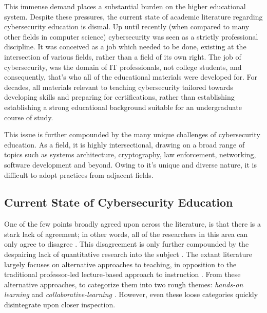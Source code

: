 \documentclass{article}
\begin{document}
    This immense demand places a substantial burden on the higher educational system. %
Despite these pressures, the current state of academic literature regarding cybersecurity education is dismal. Up until recently (when compared to many other fields in computer science) cybersecurity was seen as a strictly professional discipline. %
It was conceived as a job which needed to be done, existing at the intersection of various fields, rather than a field of its own right. %
The job of cybersecurity, was the domain of IT professionals, not college students, and consequently, that's who all of the educational materials were developed for. %
For decades, all materials relevant to teaching cybersecurity tailored towards developing skills and preparing for certifications, rather than establishing establishing a strong educational background suitable for an undergraduate course of study. 
    
    This issue is further compounded by the many unique challenges of cybersecurity education. %
As a  field, it is highly intersectional, drawing on a broad range of topics such as systems architecture, cryptography, law enforcement, networking, software development and beyond. %
Owing to it's unique and diverse nature, it is difficult to adopt practices from adjacent fields. 

    \subsection{Current State of Cybersecurity Education} 
    One of the few points broadly agreed upon across the literature, is that there is a stark lack of agreement; %
in other words, all of the researchers in this area can only agree to disagree \cite{R-Raj}. %
This disagreement is only further compounded by the despairing lack of quantitative research into the subject \cite{Z-Zeng}. %
The extant literature largely focuses on alternative approaches to teaching, in opposition to the traditional professor-led lecture-based approach to instruction \cite{Z-Zeng,N-Eliot,E-Gavas,C-Herr,K-Chung, C-Kussmaul,K-Leune,B-Payne,L-Thomas}. %
From these alternative approaches, to categorize them into two rough themes: \emph{hands-on learning} and \emph{collaborative-learning} \cite{P-Deshpande,C-Kussmaul,B-Payne}. %
However, even these loose categories quickly disintegrate upon closer inspection. 
\end{document}
